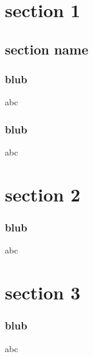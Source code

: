 \documentclass{beamer}
\begin{document}
\section{section 1}
\subsection{section name}
\begin{frame}
\frametitle{blub}
    abc
\end{frame} 
\begin{frame}
\frametitle{blub}
    abc
\end{frame} 

\section{section 2}
\begin{frame}
\frametitle{blub}
    abc
\end{frame} 

\section{section 3}
\begin{frame}
\frametitle{blub}
    abc
\end{frame}     
\end{document}
